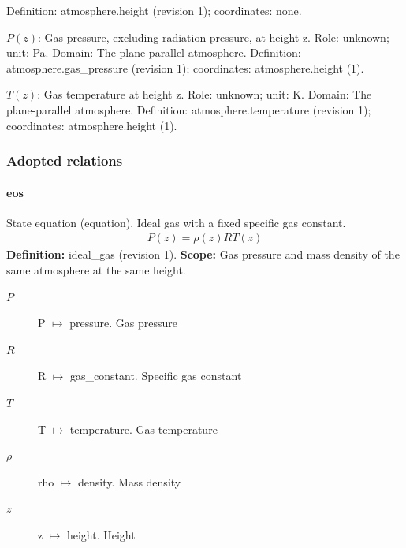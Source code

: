 \begin{description}
\newline Definition: atmosphere.height (revision 1); coordinates: none.
\item[pressure] $P(z)$: Gas pressure, excluding radiation pressure, at height z.
\newline Role: unknown; unit: Pa.
\newline Domain: The plane-parallel atmosphere.
\newline Definition: atmosphere.gas\_pressure (revision 1); coordinates: atmosphere.height (1).
\item[temperature] $T(z)$: Gas temperature at height z.
\newline Role: unknown; unit: K.
\newline Domain: The plane-parallel atmosphere.
\newline Definition: atmosphere.temperature (revision 1); coordinates: atmosphere.height (1).
\end{description}

\subsubsection*{Adopted relations}

\paragraph{eos}
State equation (equation). Ideal gas with a fixed specific gas constant.
\begin{equation}
\begin{aligned}
P(z)=\rho(z)R T(z)
\end{aligned}
\label{eq:example.isothermal_5f_atmosphere_3a_atmosphere:eos:1}
\end{equation}
\noindent\textbf{Definition:} ideal\_gas (revision 1).
\textbf{Scope:} Gas pressure and mass density of the same atmosphere at the same height.

\begin{description}
\item[$P$] P $\mapsto$ pressure. Gas pressure
\item[$R$] R $\mapsto$ gas\_constant. Specific gas constant
\item[$T$] T $\mapsto$ temperature. Gas temperature
\item[$\rho$] rho $\mapsto$ density. Mass density
\item[$z$] z $\mapsto$ height. Height
\end{description}

